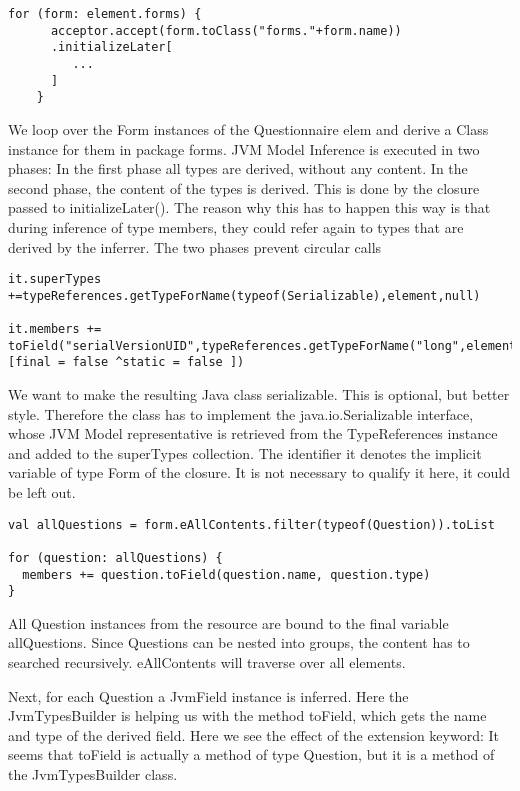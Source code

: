 \begin{lstlisting}[language=Xtend]
    for (form: element.forms) {
      acceptor.accept(form.toClass("forms."+form.name))
      .initializeLater[
         ...
      ]
    }
\end{lstlisting}

We loop over the Form instances of the Questionnaire elem and derive a Class
instance for them in package forms. JVM Model Inference is executed in two
phases: In the first phase all types are derived, without any content. In the
second phase, the content of the types is derived. This is done by the closure
passed to initializeLater(). The reason why this has to happen this way is that
during inference of type members, they could refer again to types that are
derived by the inferrer. The two phases prevent circular calls

\begin{lstlisting}[language=Xtend]
it.superTypes +=typeReferences.getTypeForName(typeof(Serializable),element,null)

it.members += toField("serialVersionUID",typeReferences.getTypeForName("long",element),[final = false ^static = false ])
\end{lstlisting}
        
We want to make the resulting Java class serializable. This is optional, but
better style. Therefore the class has to implement the java.io.Serializable
interface, whose JVM Model representative is retrieved from the TypeReferences
instance and added to the superTypes collection. The identifier it denotes the
implicit variable of type Form of the closure. It is not necessary to qualify it
here, it could be left out.

\begin{lstlisting}[language=Xtend]
val allQuestions = form.eAllContents.filter(typeof(Question)).toList

for (question: allQuestions) {
  members += question.toField(question.name, question.type)
}
\end{lstlisting}

All Question instances from the resource are bound to the final variable
allQuestions. Since Questions can be nested into groups, the content has to
searched recursively. eAllContents will traverse over all elements.

Next, for each Question a JvmField instance is inferred. Here the
JvmTypesBuilder is helping us with the method toField, which gets the name and
type of the derived field. Here we see the effect of the extension keyword: It
seems that toField is actually a method of type Question, but it is a method of
the JvmTypesBuilder class.

